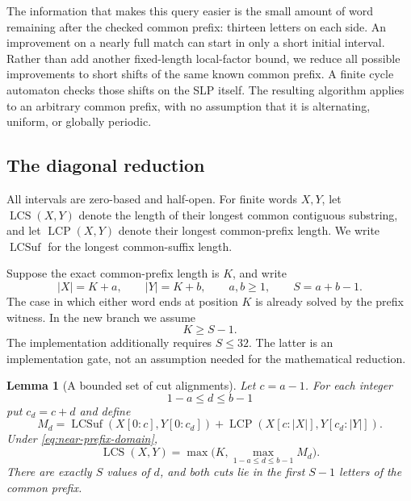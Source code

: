 \documentclass[11pt]{article}
\newtheorem{lemma}[theorem]{Lemma}
\theoremstyle{definition}
\theoremstyle{remark}
\newcommand{\LCS}{\operatorname{LCS}}
\newcommand{\LCP}{\operatorname{LCP}}
\begin{document}
The information that makes this query easier is the small amount of word
remaining after the checked common prefix: thirteen letters on each side.
An improvement on a nearly full match can start in only a short initial
interval. Rather than add another fixed-length local-factor bound, we
reduce all possible improvements to short shifts of the same known common
prefix. A finite cycle automaton checks those shifts on the SLP itself.
The resulting algorithm applies to an arbitrary common prefix, with no
assumption that it is alternating, uniform, or globally periodic.

\subsection{The diagonal reduction}

All intervals are zero-based and half-open. For finite words $X,Y$, let
$\LCS(X,Y)$ denote the length of their longest common contiguous substring,
and let $\LCP(X,Y)$ denote their longest common-prefix length. We write
$\operatorname{LCSuf}$ for the longest common-suffix length.

Suppose the exact common-prefix length is $K$, and write
\[
 |X|=K+a,\qquad |Y|=K+b,\qquad
 a,b\ge1,\qquad S=a+b-1.
\]
The case in which either word ends at position $K$ is already solved by
the prefix witness. In the new branch we assume
\begin{equation}
 K\ge S-1.
 \label{eq:near-prefix-domain}
\end{equation}
The implementation additionally requires $S\le32$. The latter is an
implementation gate, not an assumption needed for the mathematical reduction.

\begin{lemma}[A bounded set of cut alignments]
\label{lem:near-prefix-diagonals}
Let $c=a-1$. For each integer
\[
 1-a\le d\le b-1
\]
put $c_d=c+d$ and define
\[
 M_d=
 \operatorname{LCSuf}(X[0:c],Y[0:c_d])
 +\LCP(X[c:|X|],Y[c_d:|Y|]).
\]
Under \eqref{eq:near-prefix-domain},
\begin{equation}
 \LCS(X,Y)=\max\bigl(K,\max_{1-a\le d\le b-1}M_d\bigr).
 \label{eq:near-prefix-max}
\end{equation}
There are exactly $S$ values of $d$, and both cuts lie in the first
$S-1$ letters of the common prefix.
\end{lemma}
\end{document}

